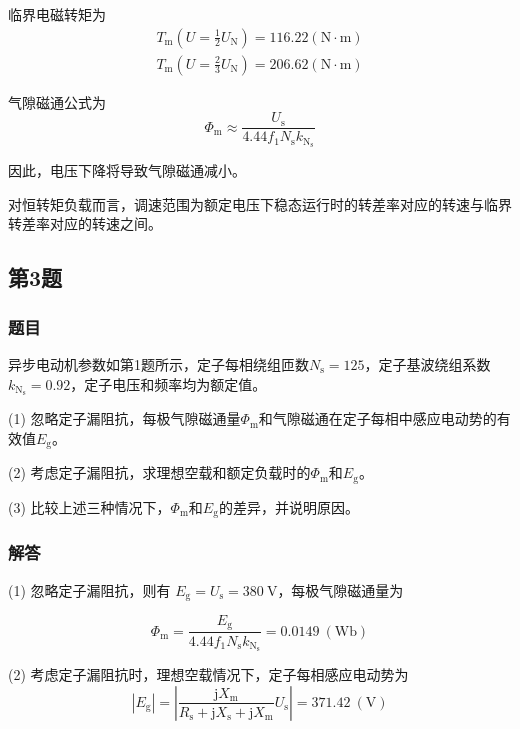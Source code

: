 \documentclass[12pt, a4paper, UTF8, fontset=adobe, oneside]{ctexbook} %
\begin{document}
临界电磁转矩为
\begin{align}
  T_{\mathrm{m}}(U=\frac{1}{2}U_{\mathrm{N}}) = 116.22 (\mathrm{N·m}) \\
  T_{\mathrm{m}}(U=\frac{2}{3}U_{\mathrm{N}}) = 206.62 (\mathrm{N·m})
\end{align}

气隙磁通公式为
\begin{equation}
  \Phi_{\mathrm{m}}\approx\frac{U_{\mathrm{s}}}{4.44f_1N_{\mathrm{s}}k_{\mathrm{N}_{\mathrm{s}}}}
\end{equation}

因此，电压下降将导致气隙磁通减小。

对恒转矩负载而言，调速范围为额定电压下稳态运行时的转差率对应的转速与临界转差率对应的转速之间。

\subsection{第3题}
\subsubsection{题目}
异步电动机参数如第1题所示，定子每相绕组匝数$N_{\mathrm{s}}=125$，定子基波绕组系数$k_{\mathrm{N}_{\mathrm{s}}}=0.92$，定子电压和频率均为额定值。

(1) 忽略定子漏阻抗，每极气隙磁通量$\Phi_{\mathrm{m}}$和气隙磁通在定子每相中感应电动势的有效值$E_{\mathrm{g}}$。

(2) 考虑定子漏阻抗，求理想空载和额定负载时的$\Phi_{\mathrm{m}}$和$E_{\mathrm{g}}$。

(3) 比较上述三种情况下，$\Phi_{\mathrm{m}}$和$E_{\mathrm{g}}$的差异，并说明原因。
\subsubsection{解答}
(1) 忽略定子漏阻抗，则有 $E_{\mathrm{g}} = U_{\mathrm{s}} = 380\ \mathrm{V}$，每极气隙磁通量为

\begin{equation}
  \Phi_{\mathrm{m}} = \frac{E_{\mathrm{g}}}{4.44f_1N_{\mathrm{s}}k_{\mathrm{N}_{\mathrm{s}}}} = 0.0149\ \mathrm{(Wb)}
\end{equation}

(2) 考虑定子漏阻抗时，理想空载情况下，定子每相感应电动势为
\begin{equation}
  \left| E_{\mathrm{g}} \right|=\left| \dfrac{\mathrm{j}X_{\mathrm{m}}}{R_{\mathrm{s}}+\mathrm{j}X_{\mathrm{s}}+\mathrm{j}X_{\mathrm{m}}} U_{\mathrm{s}} \right| = 371.42\ (\mathrm{V})  
\end{equation}
\end{document}
